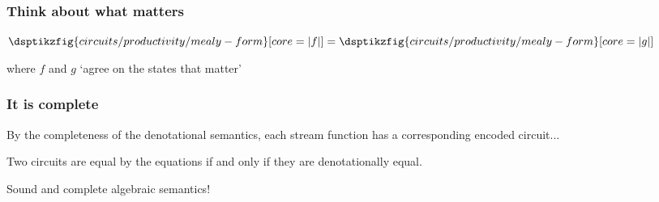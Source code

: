 \begin{frame}
    \frametitle{Think about what matters}

    \centering

    \(
    \dsptikzfig{circuits/productivity/mealy-form}[core=|f|]
    =
    \dsptikzfig{circuits/productivity/mealy-form}[core=|g|]
    \)

    \vspace{1em}

    \Large
    where \(f\) and \(g\) `agree on the states that matter'

\end{frame}

\begin{frame}
    \frametitle{It is complete}

    \centering
    \Large
    By the completeness of the denotational semantics, each stream function
    has a corresponding \alert{encoded} circuit...

    \await
    \vspace{1em}

    \begin{theorem}
        \centering
        Two circuits are equal by the equations if and only if they are
        denotationally equal.
    \end{theorem}

    \await

    Sound and complete \alert{algebraic semantics}!

\end{frame}